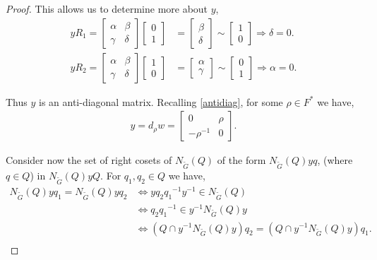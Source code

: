 \begin{proof}
This allows us to determine more about $y$,
\begin{align*} y R_1 = \begin{bmatrix} \alpha & \beta \\ \gamma & \delta \end{bmatrix} \begin{bmatrix} 0 \\ 1 \end{bmatrix} &= \begin{bmatrix} \beta \\ \delta \end{bmatrix} \sim \begin{bmatrix} 1 \\ 0 \end{bmatrix} \Longrightarrow \delta = 0.
\\[1.5ex] y R_2 = \begin{bmatrix} \alpha & \beta \\ \gamma & \delta \end{bmatrix} \begin{bmatrix} 1 \\ 0 \end{bmatrix} &= \begin{bmatrix} \alpha \\ \gamma \end{bmatrix} \sim \begin{bmatrix} 0 \\ 1 \end{bmatrix} \Longrightarrow \alpha = 0.
\end{align*}

Thus $y$ is an anti-diagonal matrix. Recalling \eqref{antidiag}, for some $\rho \in F^*$ we have,
\begin{align*} y = d_\rho w = \begin{bmatrix} 0 & \rho \\ -\rho^{-1} & 0 \end{bmatrix}.
\end{align*}

Consider now the set of right cosets of $N_{\widetilde{G}}(Q)$ of the form $N_{\widetilde{G}}(Q) y q$, (where $q \in Q$) in $N_{\widetilde{G}}(Q) y Q$. For $q_1, q_2 \in Q$ we have,
\vspace{2mm}
\begin{align*} N_{\widetilde{G}}(Q) y q_1 = N_{\widetilde{G}}(Q) y q_2 &\iff y q_2 {q_1}^{-1} y^{-1} \in N_{\widetilde{G}}(Q)
\\ &\iff q_2 {q_1}^{-1} \in y^{-1} N_{\widetilde{G}}(Q) y
\\ &\iff (Q \cap y^{-1} N_{\widetilde{G}}(Q) y) q_2 = (Q \cap y^{-1} N_{\widetilde{G}}(Q) y) q_1. \\
\end{align*}


\end{proof}
